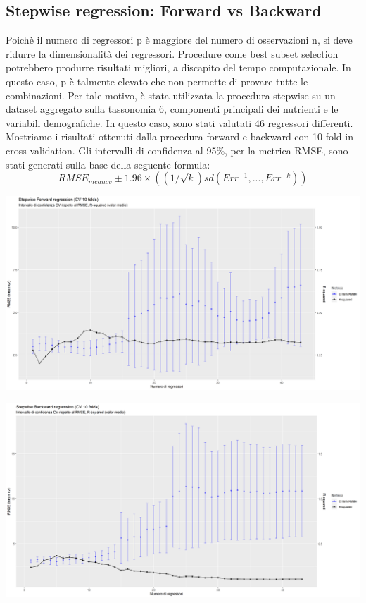 \subsection{Stepwise regression: Forward vs Backward}
Poichè il numero di regressori p è maggiore del numero di osservazioni n, si deve ridurre la dimensionalità dei regressori. Procedure come best subset selection potrebbero produrre risultati migliori, a discapito del tempo computazionale. In questo caso, p è talmente elevato che non permette di provare tutte le combinazioni. Per tale motivo, è stata utilizzata la procedura stepwise su un dataset aggregato sulla tassonomia 6, componenti principali dei nutrienti e le variabili demografiche. In questo caso, sono stati valutati 46 regressori differenti.  Mostriamo i risultati ottenuti dalla procedura forward e backward con 10 fold in cross validation. Gli intervalli di confidenza al 95\%, per la metrica RMSE, sono stati generati sulla base della seguente formula:
$$RMSE_{meancv} \pm 1.96\times ((1/\sqrt{k})sd(Err^{-1}, ... , Err^{-k}))$$


\begin{Figure}
    \centering
    \includegraphics[width=17cm,keepaspectratio]{images/ci_stepwise_forward.png}
  \end{Figure}
\begin{Figure}
    \centering
    \includegraphics[width=17cm,keepaspectratio]{images/ci_stepwise_backward.png}
  \end{Figure}

